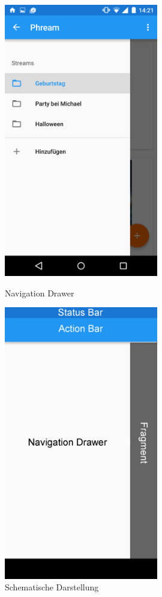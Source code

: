 \begin{figure}[H]
\centering
	\begin{minipage}{0.4\textwidth} 
	\centering
	\includegraphics[width=0.6\textwidth]{images/screenshots/navigationdrawer.png}
	\caption{Navigation Drawer}
	\label{label:navigationdrawer}
	\end{minipage}
	\hfill
	\begin{minipage}{0.4\textwidth}
	\centering
	\includegraphics[width=0.6\textwidth]{images/screenshots/navigationdrawer_schema.png}
	\caption{Schematische Darstellung}
	\label{label:navigationdrawer_schema}
	\end{minipage}
\end{figure}
